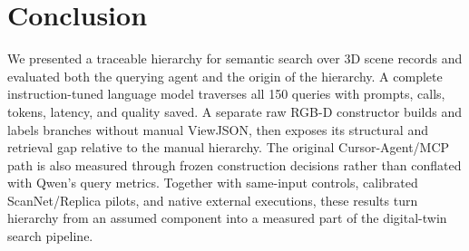 \documentclass[runningheads]{llncs}
\begin{document}
\section{Conclusion}
We presented a traceable hierarchy for semantic search over 3D scene records
and evaluated both the querying agent and the origin of the hierarchy. A
complete instruction-tuned language model traverses all 150 queries with
prompts, calls, tokens, latency, and quality saved. A separate raw RGB-D
constructor builds and labels branches without manual ViewJSON, then exposes
its structural and retrieval gap relative to the manual hierarchy. The
original Cursor-Agent/MCP path is also measured through frozen construction
decisions rather than conflated with Qwen's query metrics. Together with
same-input controls, calibrated ScanNet/Replica pilots, and native external
executions, these results turn hierarchy from an assumed component into a
measured part of the digital-twin search pipeline.



\end{document}

